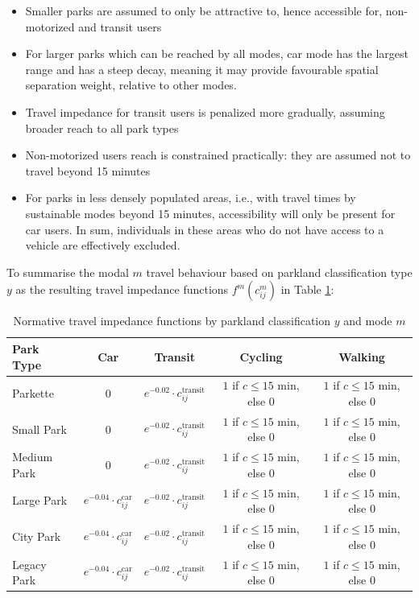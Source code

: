 \documentclass[
11pt, %
oneside, %
english, %
singlespacing, %
]{macthesis} %
\def\tightlist{}
\begin{document}
\begin{itemize}
\tightlist
\item
  Smaller parks are assumed to only be attractive to, hence accessible for, non-motorized and transit users
\item
  For larger parks which can be reached by all modes, car mode has the largest range and has a steep decay, meaning it may provide favourable spatial separation weight, relative to other modes.
\item
  Travel impedance for transit users is penalized more gradually, assuming broader reach to all park types
\item
  Non-motorized users reach is constrained practically: they are assumed not to travel beyond 15 minutes
\item
  For parks in less densely populated areas, i.e., with travel times by sustainable modes beyond 15 minutes, accessibility will only be present for car users. In sum, individuals in these areas who do not have access to a vehicle are effectively excluded.
\end{itemize}

To summarise the modal \(m\) travel behaviour based on parkland classification type \(y\) as the resulting travel impedance functions \(f^m(c^m_{ij})\) in Table \ref{tab:chp3-travel-impedance-by-park-mode}:

\begin{table}[ht]
\centering
\small
\begin{tabular}{|l|c|c|c|c|}
\hline
\textbf{Park Type} & \textbf{Car} & \textbf{Transit} & \textbf{Cycling} & \textbf{Walking} \\
\hline
Parkette &
0 &
$e^{-0.02} \cdot c_{ij}^{\text{transit}}$ &
$1$ if $c \leq 15$ min, else 0 &
$1$ if $c \leq 15$ min, else 0 \\
\hline
Small Park &
0 &
$e^{-0.02} \cdot c_{ij}^{\text{transit}}$ &
$1$ if $c \leq 15$ min, else 0 &
$1$ if $c \leq 15$ min, else 0 \\
\hline
Medium Park &
0 &
$e^{-0.02} \cdot c_{ij}^{\text{transit}}$ &
$1$ if $c \leq 15$ min, else 0 &
$1$ if $c \leq 15$ min, else 0 \\
\hline
Large Park &
$e^{-0.04} \cdot c_{ij}^{\text{car}}$ &
$e^{-0.02} \cdot c_{ij}^{\text{transit}}$ &
$1$ if $c \leq 15$ min, else 0 &
$1$ if $c \leq 15$ min, else 0 \\
\hline
City Park &
$e^{-0.04} \cdot c_{ij}^{\text{car}}$ &
$e^{-0.02} \cdot c_{ij}^{\text{transit}}$ &
$1$ if $c \leq 15$ min, else 0 &
$1$ if $c \leq 15$ min, else 0 \\
\hline
Legacy Park &
$e^{-0.04} \cdot c_{ij}^{\text{car}}$ &
$e^{-0.02} \cdot c_{ij}^{\text{transit}}$ &
$1$ if $c \leq 15$ min, else 0 &
$1$ if $c \leq 15$ min, else 0 \\
\hline
\end{tabular}
\caption{Normative travel impedance functions by parkland classification $y$ and mode $m$}
\label{tab:chp3-travel-impedance-by-park-mode}
\end{table}
\end{document}
